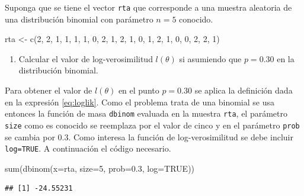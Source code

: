 \documentclass[
]{book}
\makeatletter
\newenvironment{Shaded}{\begin{snugshade}}{\end{snugshade}}
\newcommand{\AttributeTok}[1]{\textcolor[rgb]{0.77,0.63,0.00}{#1}}
\newcommand{\ConstantTok}[1]{\textcolor[rgb]{0.00,0.00,0.00}{#1}}
\newcommand{\DecValTok}[1]{\textcolor[rgb]{0.00,0.00,0.81}{#1}}
\newcommand{\FloatTok}[1]{\textcolor[rgb]{0.00,0.00,0.81}{#1}}
\newcommand{\FunctionTok}[1]{\textcolor[rgb]{0.00,0.00,0.00}{#1}}
\newcommand{\NormalTok}[1]{#1}
\newcommand{\OtherTok}[1]{\textcolor[rgb]{0.56,0.35,0.01}{#1}}
\providecommand{\tightlist}{%
  \setlength{\itemsep}{0pt}\setlength{\parskip}{0pt}}
\newenvironment{kframe}{%
\medskip{}
\setlength{\fboxsep}{.8em}
 \def\at@end@of@kframe{}%
 \ifinner\ifhmode%
  \def\at@end@of@kframe{\end{minipage}}%
  \begin{minipage}{\columnwidth}%
 \fi\fi%
 \def\FrameCommand##1{\hskip\@totalleftmargin \hskip-\fboxsep
 \colorbox{shadecolor}{##1}\hskip-\fboxsep
     \hskip-\linewidth \hskip-\@totalleftmargin \hskip\columnwidth}%
 \MakeFramed {\advance\hsize-\width
   \@totalleftmargin\z@ \linewidth\hsize
   \@setminipage}}%
 {\par\unskip\endMakeFramed%
 \at@end@of@kframe}
\renewenvironment{Shaded}{\begin{kframe}}{\end{kframe}}
\makeatother
\begin{document}
Suponga que se tiene el vector \texttt{rta} que corresponde a una muestra aleatoria de una distribución binomial con parámetro \(n=5\) conocido.

\begin{Shaded}
\begin{Highlighting}[]
\NormalTok{rta }\OtherTok{\textless{}{-}} \FunctionTok{c}\NormalTok{(}\DecValTok{2}\NormalTok{, }\DecValTok{2}\NormalTok{, }\DecValTok{1}\NormalTok{, }\DecValTok{1}\NormalTok{, }\DecValTok{1}\NormalTok{, }\DecValTok{1}\NormalTok{, }\DecValTok{0}\NormalTok{, }\DecValTok{2}\NormalTok{, }\DecValTok{1}\NormalTok{, }\DecValTok{2}\NormalTok{,}
         \DecValTok{1}\NormalTok{, }\DecValTok{0}\NormalTok{, }\DecValTok{1}\NormalTok{, }\DecValTok{2}\NormalTok{, }\DecValTok{1}\NormalTok{, }\DecValTok{0}\NormalTok{, }\DecValTok{0}\NormalTok{, }\DecValTok{2}\NormalTok{, }\DecValTok{2}\NormalTok{, }\DecValTok{1}\NormalTok{)}
\end{Highlighting}
\end{Shaded}

\begin{enumerate}
\def\labelenumi{\arabic{enumi})}
\tightlist
\item
  Calcular el valor de log-verosimilitud \(l(\theta)\) si asumiendo que \(p=0.30\) en la distribución binomial.
\end{enumerate}

Para obtener el valor de \(l(\theta)\) en el punto \(p=0.30\) se aplica la definición dada en la expresión \eqref{eq:loglik}. Como el problema trata de una binomial se usa entonces la función de masa \texttt{dbinom} evaluada en la muestra \texttt{rta}, el parámetro \texttt{size} como es conocido se reemplaza por el valor de cinco y en el parámetro \texttt{prob} se cambia por 0.3. Como interesa la función de log-verosimilitud se debe incluir \texttt{log=TRUE}. A continuación el código necesario.

\begin{Shaded}
\begin{Highlighting}[]
\FunctionTok{sum}\NormalTok{(}\FunctionTok{dbinom}\NormalTok{(}\AttributeTok{x=}\NormalTok{rta, }\AttributeTok{size=}\DecValTok{5}\NormalTok{, }\AttributeTok{prob=}\FloatTok{0.3}\NormalTok{, }\AttributeTok{log=}\ConstantTok{TRUE}\NormalTok{))}
\end{Highlighting}
\end{Shaded}

\begin{verbatim}
## [1] -24.55231
\end{verbatim}
\end{document}
